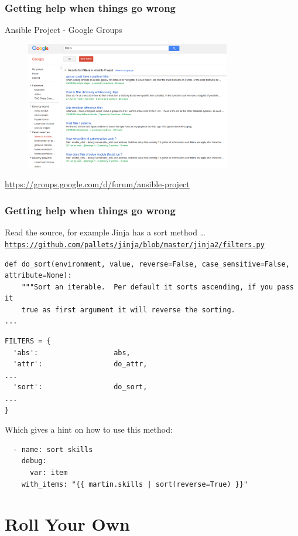 \documentclass[pdf]{beamer}
\begin{document}
\begin{frame}[fragile]
  \frametitle{Getting help when things go wrong}
  Ansible Project - Google Groups
  \begin{center}
    \begin{figure}
      \includegraphics[width=0.8\textwidth]{ansible-google-group.png}
    \end{figure}
  \end{center}
  \tiny \url{https://groups.google.com/d/forum/ansible-project}
\end{frame}

\begin{frame}[fragile]
  \frametitle{Getting help when things go wrong}
  Read the source, for example Jinja has a sort method \ldots
  \newline
  \texttt{
    \tiny \url{https://github.com/pallets/jinja/blob/master/jinja2/filters.py}
  }
  \begin{lstlisting}
def do_sort(environment, value, reverse=False, case_sensitive=False, attribute=None):
    """Sort an iterable.  Per default it sorts ascending, if you pass it
    true as first argument it will reverse the sorting.
...
  \end{lstlisting}
  \pause{}
  \begin{lstlisting}
FILTERS = {
  'abs':                  abs,
  'attr':                 do_attr, 
...
  'sort':                 do_sort,
...
}
  \end{lstlisting}
  \pause{}
  Which gives a hint on how to use this method:
  \begin{lstlisting}
  - name: sort skills
    debug:
      var: item
    with_items: "{{ martin.skills | sort(reverse=True) }}"
  \end{lstlisting}
\end{frame}

\section{Roll Your Own}
\end{document}

